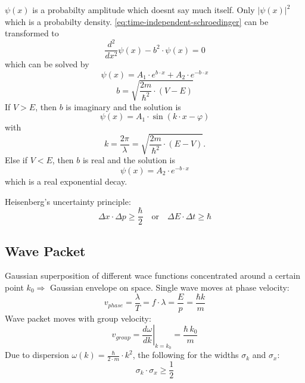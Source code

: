 \(\psi(x)\) is a probabilty amplitude which doesnt say much itself. Only \(|\psi(x)|^2\) which is a probabilty density.
\cref{eq:time-independent-schroedinger} can be transformed to 
\begin{equation*}
    \frac{d^2}{dx^2} \psi(x) - b^2 \cdot \psi(x) = 0
\end{equation*}
which can be solved by
\begin{equation*}
    \psi(x) = A_1 \cdot e^{b \cdot x} + A_2 \cdot e^{-b \cdot x}
\end{equation*}
\begin{equation*}
    b = \sqrt{\frac{2m}{\hbar^2}\cdot (V-E)}
\end{equation*}
If \(V > E\), then \(b\) is imaginary and the solution is
\begin{equation*}
    \psi(x) = A_1 \cdot \sin(k \cdot x - \varphi)
\end{equation*}
with
\begin{equation*}
    k =\frac{2\pi}{\lambda} =  \sqrt{\frac{2m}{\hbar^2}\cdot (E-V)}.
\end{equation*}
Else if \(V < E\), then \(b\) is real and the solution is
\begin{equation*}
    \psi(x) = A_2 \cdot e^{-b \cdot x}
\end{equation*}
which is a real exponential decay.

Heisenberg's uncertainty principle:
\begin{equation*}
    \Delta x \cdot \Delta p \geq \frac{\hbar}{2}\quad \text{or}\quad \Delta E \cdot \Delta t \geq \hbar
\end{equation*}

\subsection{Wave Packet}
Gaussian superposition of different wace functions concentrated around a certain point \(k_0 \Rightarrow\) Gaussian envelope on space.
Single wave moves at phase velocity:
\begin{equation*}
    v_{phase} = \frac{\lambda}{T} = f \cdot \lambda = \frac{E}{p} = \frac{\hbar k}{m}
\end{equation*}
Wave packet moves with group velocity:
\begin{equation*}
    v_{group} = \left.\frac{d\omega}{dk}\right|_{k = k_0} = \frac{\hbar\, k_0}{m}
\end{equation*}
Due to dispersion \(\omega(k) = \frac{\hbar}{2\cdot m}\cdot k^2\), the following for the widths \(\sigma_k\) and \(\sigma_x\):
\begin{equation*}
    \sigma_k \cdot \sigma_x \ge \frac{1}{2}
\end{equation*}


